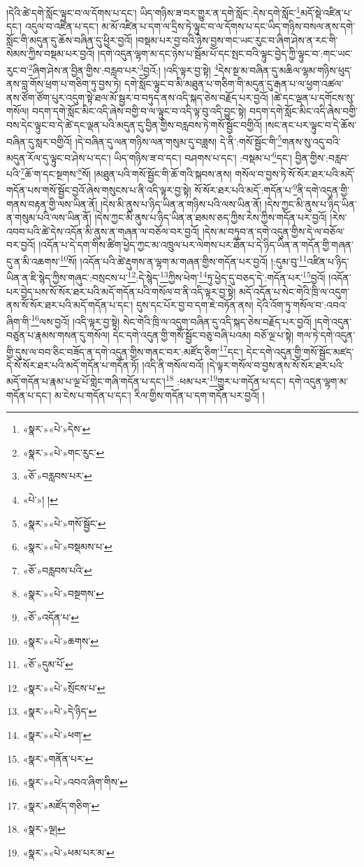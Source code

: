 །དེའི་ཚེ་དགེ་སློང་ལྟུང་བ་ལ་དོགས་པ་དང་། ཡིད་གཉིས་ཟ་བར་གྱུར་ན་དགེ་སློང་:དེས་དགེ་སློང་\footnote{«སྣར་»«པེ་»དེས་}མདོ་སྡེ་འཛིན་པ་དང་། འདུལ་བ་འཛིན་པ་དང་། མ་མོ་འཛིན་པ་དག་ལ་དྲིས་ཏེ་ལྟུང་བ་ལ་དོགས་པ་དང་ཡིད་གཉིས་བསལ་ནས་དགེ་སློང་གི་མདུན་དུ་ཆོས་བཞིན་དུ་ཕྱིར་བྱའོ། །བསྡམ་པར་བྱ་བའི་ཉེས་བྱས་གང་ཡང་རུང་བ་ཞིག་ཤེས་ན་རང་གི་སེམས་ཀྱིས་བསྡམ་པར་བྱའོ། །དགེ་འདུན་ལྷག་མ་དང་ཉེས་པ་སྦོམ་པོ་དང་སྤང་བའི་ལྟུང་བྱེད་ཀྱི་ལྟུང་བ་:གང་ཡང་རུང་བ་\footnote{«སྣར་»«པེ་»གང་རུང་}ཞིག་ཤེས་ན་བྱིན་གྱིས་:བརླབ་པར་\footnote{«ཅོ་»བརླབས་པར་}བྱའོ:། །འདི་ལྟར་བྱ་སྟེ། \footnote{«པེ་»། ། }དེས་སྔ་མ་བཞིན་དུ་མཆིལ་ལྷམ་གཉིས་ཕུད་ནས་བླ་གོས་ཕྲག་པ་གཅིག་ཏུ་བྱས་ཏེ། དགེ་སློང་ལྟུང་བ་མི་མཐུན་པ་གཅིག་གི་མདུན་དུ་རྒན་པ་ལ་ཕྱག་འཚལ་ནས་ཙོག་ཙོག་པུར་འདུག་སྟེ་ཐལ་མོ་སྦྱར་བ་བཏུད་ནས་འདི་སྐད་ཅེས་བརྗོད་པར་བྱའོ། །ཚེ་དང་ལྡན་པ་དགོངས་སུ་གསོལ། བདག་དགེ་སློང་མིང་འདི་ཞེས་བགྱི་བ་ལ་ལྟུང་བ་འདི་ལྟ་བུ་འདི་བྱུང་སྟེ། བདག་དགེ་སློང་མིང་འདི་ཞེས་བགྱི་བས་དེང་ལྟུང་བ་དེ་ཚེ་དང་ལྡན་པའི་མདུན་དུ་བྱིན་གྱིས་བརླབས་ཏེ་གསོ་སྦྱོང་བགྱིའོ། །སང་ནང་པར་ལྟུང་བ་དེ་ཆོས་བཞིན་དུ་སླར་བགྱིའོ། །དེ་བཞིན་དུ་ལན་གཉིས་ལན་གསུམ་དུ་བཟླས། དེ་ནི་:གསོ་སྦྱོང་གི་\footnote{«སྣར་»«པེ་»གསོ་སྦྱོང་}གནས་སུ་འདུ་བའི་མདུན་རོལ་དུ་ལྟུང་བ་ཤེས་པ་དང་། ཡིད་གཉིས་ཟ་བ་དང་། བཤགས་པ་དང་། :བསྡམ་པ་\footnote{«སྣར་»«པེ་»བསྡམས་པ་}དང་། བྱིན་གྱིས་:བརླབ་པའི་\footnote{«ཅོ་»བརླབས་པའི་}ཆོ་ག་དང་སྔགས་\footnote{«སྣར་»«པེ་»བསྔགས་}སོ། །མཐུན་པའི་གསོ་སྦྱོང་གི་ཆོ་གའི་སྐབས་ནས། གསོལ་བ་བྱས་ཏེ་སོ་སོར་ཐར་པའི་མདོ་གདོན་པས་གསོ་སྦྱོང་བྱའོ་ཞེས་གསུངས་པ་ནི་འདི་ལྟར་བྱ་སྟེ། སོ་སོར་ཐར་པའི་མདོ་:གདོན་པ་\footnote{«ཅོ་»འདོན་པ་}ནི་དགེ་འདུན་གྱི་གནས་བརྟན་གྱི་ལས་ཡིན་ནོ། །དེས་མི་ནུས་པ་ཉིད་ཡིན་ན་གཉིས་པའི་ལས་ཡིན་ནོ། །དེས་ཀྱང་མི་ནུས་པ་ཉིད་ཡིན་ན་གསུམ་པའི་ལས་ཡིན་ནོ། །དེས་ཀྱང་མི་ནུས་པ་ཉིད་ཡིན་ན་ཐམས་ཅད་ཀྱིས་རེས་ཀྱིས་གདོན་པར་བྱའོ། །རེས་འབབ་པའི་ཚེ་དེས་འདོན་མི་ནུས་ན་གཞན་ལ་བཅོལ་བར་བྱའོ། །དེས་མ་བཏུབ་ན་དགེ་འདུན་གྱིས་དེ་ལ་བཅོལ་བར་བྱའོ། །འདོན་པ་དེ་དག་གིས་ཚིག་ཕྱེད་ཀྱང་མ་འཁྲུལ་པར་ལེགས་པར་ཐོན་པ་དེ་ཉིད་ཡིན་ན་གདོན་གྱི་གཞན་དུ་ན་མི་འཆགས་\footnote{«སྣར་»«པེ་»ཆགས་}སོ། །འདོན་པའི་ཚེ་རྡུགས་ན་ལྷག་མ་གཞན་གྱིས་གདོན་པར་བྱའོ། །:དུམ་བུ་\footnote{«ཅོ་»དུམ་པོ་}འཛིན་པ་ཉིད་ཡིན་ན་ཇི་སྙེད་ཀྱིས་གཞུང་:བསྲངས་པ་\footnote{«སྣར་»«པེ་»སྲོངས་པ་}:དེ་སྙེད་\footnote{«སྣར་»«པེ་»དེ་ཉིད་}ཀྱིས་ཕེག་\footnote{«སྣར་»«པེ་»ཕག་}ཏུ་ཕྱེད་དུ་བཅད་དེ་:གདོན་པར་\footnote{«སྣར་»གནོན་པར་}བྱའོ། །འདོན་པར་བྱེད་པས་སོ་སོར་ཐར་པའི་མདོ་གདོན་པའི་གསོལ་བ་ནི་འདི་ལྟར་བྱ་སྟེ། མདོ་འདོན་པ་སེང་གེའི་ཁྲི་ལ་འདུག་ནས་སོ་སོར་ཐར་པའི་མདོ་གདོན་པ་དང་། དུས་དང་པོར་བྱ་བ་དག་ཇེ་བཏོན་ནས། དེའི་འོག་ཏུ་གསོལ་བ་:འབའ་ཞིག་གི་\footnote{«སྣར་»«པེ་»འབའ་ཞིག་གིས་}ལས་བྱའོ། །འདི་ལྟར་བྱ་སྟེ། སེང་གེའི་ཁྲི་ལ་འདུག་བཞིན་དུ་འདི་སྐད་ཅེས་བརྗོད་པར་བྱའོ། །དགེ་འདུན་བཙུན་པ་རྣམས་གསན་དུ་གསོལ། དེང་དགེ་འདུན་གྱི་གསོ་སྦྱོང་བཅུ་བཞི་པའམ། བཅོ་ལྔ་པ་སྟེ། གལ་ཏེ་དགེ་འདུན་གྱི་དུས་ལ་བབ་ཅིང་བཟོད་ན་དགེ་འདུན་གྱིས་གནང་བར་:མཛོད་ཅིག་\footnote{«སྣར་»མཛོད་གཅིག་}དང་། དེང་དགེ་འདུན་གྱི་གསོ་སྦྱོང་མཛད་དེ་སོ་སོར་ཐར་པའི་མདོ་གདོན་པ་གདོན་ཏོ། །འདི་ནི་གསོལ་བའོ། །དེ་ལྟར་གསོལ་བ་བྱས་ནས་སོ་སོར་ཐར་པའི་མདོ་གདོན་པ་རྣམ་པ་ལྔ་པོ་གླེང་གཞི་གདོན་པ་དང་།\footnote{«སྣར་»ལྔ།} :ཕམ་པར་\footnote{«སྣར་»«པེ་»ཕམ་པར་མ་}གྱུར་པ་གདོན་པ་དང་། དགེ་འདུན་ལྷག་མ་གདོན་པ་དང་། མ་ངེས་པ་གདོན་པ་དང་། རིལ་གྱིས་གདོན་པ་དག་གདོན་པར་བྱའོ། །
